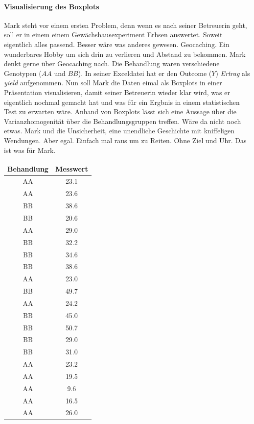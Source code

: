 \documentclass[a4paper, 9pt]{scrartcl}\usepackage[]{graphicx}\usepackage[]{xcolor}
\begin{document}
\ifcollection
\paragraph{Visualisierung des Boxplots}
\fi

Mark steht vor einem ersten Problem, denn wenn es nach seiner Betreuerin geht, soll er in einem einem Gewächshausexperiment Erbsen auswertet. Soweit eigentlich alles passend. Besser wäre was anderes gewesen. Geocaching. Ein wunderbares Hobby um sich drin zu verlieren und Abstand zu bekommen. Mark denkt gerne über Geocaching nach. Die Behandlung waren verschiedene Genotypen ($AA$ und $BB$). In seiner Exceldatei hat er den Outcome ($Y$) \textit{Ertrag} als \textit{yield} aufgenommen. Nun soll Mark die Daten eimal als Boxplots in einer Präsentation visualisieren, damit seiner Betreuerin wieder klar wird, was er eigentlich nochmal gemacht hat und was für ein Ergbnis in einem statistischen Test zu erwarten wäre. Anhand von Boxplots lässt sich eine Aussage über die Varianzhomogenität über die Behandlungsgruppen treffen. Wäre da nicht noch etwas. Mark und die Unsicherheit, eine unendliche Geschichte mit kniffeligen Wendungen. Aber egal. Einfach mal raus um zu Reiten. Ohne Ziel und Uhr. Das ist was für Mark.

\begin{table}[!h]
\centering
\begin{tabular}{cc}
\toprule
Behandlung & Messwert\\
\midrule
AA & 23.1\\
AA & 23.6\\
BB & 38.6\\
BB & 20.6\\
AA & 29.0\\
\addlinespace
BB & 32.2\\
BB & 34.6\\
BB & 38.6\\
AA & 23.0\\
BB & 49.7\\
\addlinespace
AA & 24.2\\
BB & 45.0\\
BB & 50.7\\
BB & 29.0\\
BB & 31.0\\
\addlinespace
AA & 23.2\\
AA & 19.5\\
AA & 9.6\\
AA & 16.5\\
AA & 26.0\\
\bottomrule
\end{tabular}
\end{table}
\end{document}

